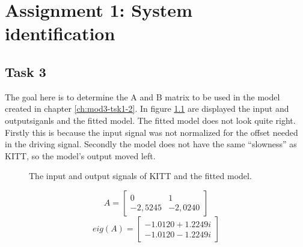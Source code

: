 \documentclass[final]{scrreprt} %
\begin{document}
\chapter{Assignment 1: System identification}
\label{ch:mod3-ass1}
\section{Task 3}
\label{sec:mod3-tsk3}
The goal here is to determine the A and B matrix to be used in the model created in chapter \ref{ch:mod3-tsk1-2}.
In figure \ref{fig:KITT-input-output-model-output} are displayed the input and outputsiganls and the fitted model.
The fitted model does not look quite right.
Firstly this is because the input signal was not normalized for the offset needed in the driving signal.
Secondly the model does not have the same “slowness” as KITT, so the model’s output moved left.

\begin{figure}[H]
	\centering
    	\setlength\figureheight{4cm}
    	\setlength{}
    	
    	\caption{The input and output signals of KITT and the fitted model.}
    	\label{fig:KITT-input-output-model-output}    	
\end{figure}
\begin{equation}
A=
\begin{bmatrix}
  0 & 1 \\
  -2,5245 & -2,0240
 \end{bmatrix}
\end{equation}
\begin{equation}
eig(A)=
\begin{bmatrix}
 -1.0120 + 1.2249i \\
  -1.0120 - 1.2249i
 \end{bmatrix}
\end{equation}
\end{document}
